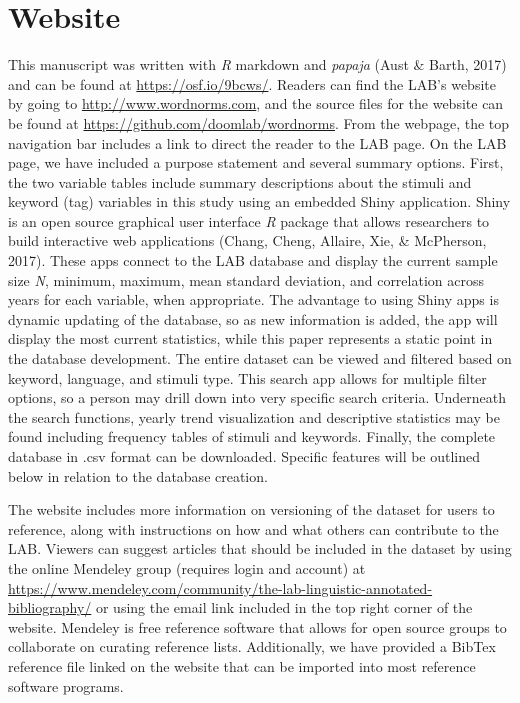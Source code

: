\documentclass[english,,man]{apa6}
\theoremstyle{definition}
\theoremstyle{definition}
\theoremstyle{definition}
\theoremstyle{remark}
\begin{document}
\hypertarget{website}{%
\section{Website}\label{website}}

This manuscript was written with \emph{R} markdown and \emph{papaja}
(Aust \& Barth, 2017) and can be found at \url{https://osf.io/9bcws/}.
Readers can find the LAB's website by going to
\url{http://www.wordnorms.com}, and the source files for the website can
be found at \url{https://github.com/doomlab/wordnorms}. From the
webpage, the top navigation bar includes a link to direct the reader to
the LAB page. On the LAB page, we have included a purpose statement and
several summary options. First, the two variable tables include summary
descriptions about the stimuli and keyword (tag) variables in this study
using an embedded Shiny application. Shiny is an open source graphical
user interface \emph{R} package that allows researchers to build
interactive web applications (Chang, Cheng, Allaire, Xie, \& McPherson,
2017). These apps connect to the LAB database and display the current
sample size \emph{N}, minimum, maximum, mean standard deviation, and
correlation across years for each variable, when appropriate. The
advantage to using Shiny apps is dynamic updating of the database, so as
new information is added, the app will display the most current
statistics, while this paper represents a static point in the database
development. The entire dataset can be viewed and filtered based on
keyword, language, and stimuli type. This search app allows for multiple
filter options, so a person may drill down into very specific search
criteria. Underneath the search functions, yearly trend visualization
and descriptive statistics may be found including frequency tables of
stimuli and keywords. Finally, the complete database in .csv format can
be downloaded. Specific features will be outlined below in relation to
the database creation.

The website includes more information on versioning of the dataset for
users to reference, along with instructions on how and what others can
contribute to the LAB. Viewers can suggest articles that should be
included in the dataset by using the online Mendeley group (requires
login and account) at
\url{https://www.mendeley.com/community/the-lab-linguistic-annotated-bibliography/}
or using the email link included in the top right corner of the website.
Mendeley is free reference software that allows for open source groups
to collaborate on curating reference lists. Additionally, we have
provided a BibTex reference file linked on the website that can be
imported into most reference software programs.
\end{document}
